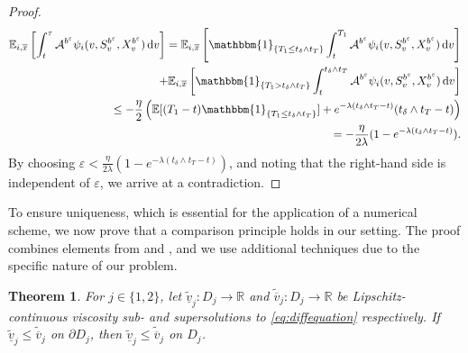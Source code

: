 \documentclass[a4paper]{scrartcl}
\newtheorem{thm}{Theorem}[section]
\theoremstyle{remark}
\theoremstyle{definition}
\numberwithin{equation}{section}
\newcommand*\diff{\mathop{}\!\mathrm{d}}
\newcommand{\ind}{\mathbbm{1}_}
\begin{document}
\begin{proof}
\begin{align*}
    \mathbb{E}_{i,\overline{x}}\left[\int_t^\tau \mathcal{A}^{b^{\varepsilon}} \psi_{i}(v,S_v^{b^{\varepsilon}},X_v^{b^{\varepsilon}}) \diff v  \right] = \mathbb{E}_{i,\overline{x}}\left[\ind{\{T_1 \leq t_\delta \wedge t_T\}}\int_t^{T_1}\mathcal{A}^{b^{\varepsilon}} \psi_{i}(v,S_v^{b^{\varepsilon}},X_v^{b^{\varepsilon}}) \diff v  \right] \\
    + \mathbb{E}_{i,\overline{x}}\left[\ind{\{T_1 > t_\delta \wedge t_T\}}\int_t^{t_\delta \wedge t_T}\mathcal{A}^{b^{\varepsilon}} \psi_{i}(v,S_v^{b^{\varepsilon}},X_v^{b^{\varepsilon}}) \diff v  \right] \\
    \leq -\frac{\eta}{2} \left(\mathbb{E}[(T_1-t)\ind{\{T_1 \leq t_\delta \wedge t_T\}}] + e^{-\lambda(t_\delta \wedge t_T -t)}(t_\delta\wedge t_T-t) \right)\\
    = -\frac{\eta}{2 \lambda} (1-e^{-\lambda(t_\delta\wedge t_T-t)}).
\end{align*}
By choosing $\varepsilon<\frac{\eta}{2 \lambda} \left(1-e^{-\lambda(t_\delta\wedge t_T-t)}\right)$, and noting that the right-hand side is independent of $\varepsilon$, we arrive at a contradiction.
\end{proof}
To ensure uniqueness, which is essential for the application of a numerical scheme, we now prove that a comparison principle holds in our setting. The proof combines elements from \cite{AzcueMuler2014} and \cite{HuyenPham2009}, and we use additional techniques due to the specific nature of our problem.
\begin{thm}
    For $j \in \{1,2\}$, let $\tilde{\underline{v}}_j:D_j\to\mathbb{R}$ and $\tilde{\overline{v}}_j:D_j\to\mathbb{R}$ be Lipschitz-continuous viscosity sub- and supersolutions to \eqref{eq:diffequation} respectively. If $\tilde{\underline{v}}_j\leq\tilde{\overline{v}}_j$ on $\partial D_j$, then $\tilde{\underline{v}}_j\leq \tilde{\overline{v}}_j$ on $D_j$. 
\end{thm}
\end{document}
